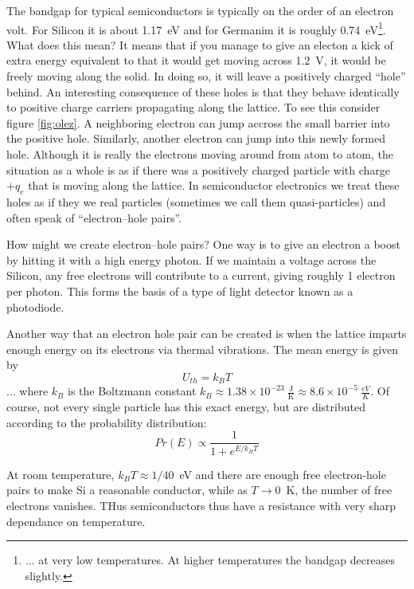 \documentclass{tufte-book}
\begin{document}
The bandgap for typical semiconductors is typically on the order of an electron volt. For Silicon it is about 1.17~eV and for Germanim it is roughly 0.74~eV\footnote{... at very low temperatures. At higher temperatures the bandgap decreases slightly.}. What does this mean? It means that if you manage to give an electon a kick of extra energy equivalent to that it would get moving across 1.2~V, it would be freely moving along the solid. In doing so, it will leave a positively charged ``hole'' behind. An interesting consequence of these holes is that they behave identically to positive charge carriers propagating along the lattice. To see this consider figure \ref{fig:olez}. A neighboring electron can jump accross the small barrier into the positive hole. Similarly, another electron can jump into this newly formed hole. Although it is really the electrons moving around from atom to atom, the situation as a whole is as if there was a positively charged particle with charge $+q_e$ that is moving along the lattice. In semiconductor electronics we treat these holes as if they we real particles (sometimes we call them quasi-particles) and often speak of ``electron--hole pairs''.

How might we create electron--hole pairs? One way is to give an electron a boost by hitting it with a high energy photon. If we maintain a voltage across the Silicon, any free electrons will contribute to a current, giving roughly 1 electron per photon. This forms the basis of a type of light detector known as a photodiode.

Another way that an electron hole pair can be created is when the lattice imparts enough energy on its electrons via thermal vibrations. The mean energy is given by 
\begin{equation}
\label{eq:thermal_energy}
U_{th} = k_BT
\end{equation}
\noindent ... where $k_B$ is the Boltzmann constant $k_B \approx 1.38\times10^{-23}~\frac{\text{J}}{\text{K}}\approx 8.6\times10^{-5}~\frac{eV}{K}$. Of course, not every single particle has this exact energy, but are distributed according to the probability distribution:
\begin{equation}
\label{eq:thermal_distn}
Pr(E) \propto \frac{1}{1+e^{E/k_BT}}
\end{equation}

\noindent At room temperature, $k_BT\approx 1/40$~eV and there are enough free electron-hole pairs to make Si a reasonable conductor, while as $T\rightarrow0$~K, the number of free electrons vanishes. THus semiconductors thus have a resistance with very sharp dependance on temperature. 
\end{document}
